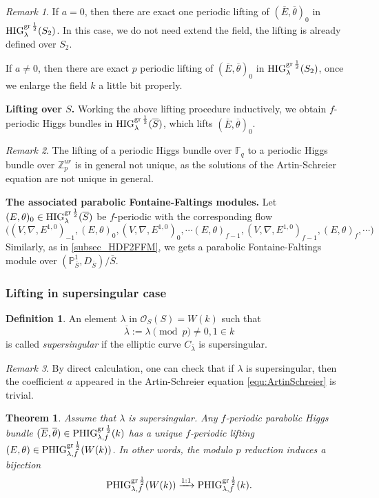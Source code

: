 \documentclass[12pt,twoside]{book}
\theoremstyle{plain}
\newtheorem{theorem}{Theorem}[section]
\theoremstyle{definition}
\newtheorem{definition}[definition]{Definition}
\theoremstyle{remark}
\newtheorem{remark}[remark]{Remark}
\newcommand{\bP}{{\mathbb P}}
\newcommand{\bZ}{{\mathbb Z}}
\newcommand{\mO}{{\mathcal O}}
\newcommand{\Fq}{{\mathbb{F}_q}}
\numberwithin{equation}{section}
\def\High{{\mathrm{HIG}^{{\rm gr}\,{1\over 2}}_{\lambda}}}
\def\PHighf{{\mathrm{PHIG}^{{\rm gr}\,{1\over 2}}_{\lambda,f}}}
\begin{document}
\begin{remark}
If $a=0$, then there are exact one periodic lifting of $(\overline E,\overline\theta)_{0}$ in $\High(S_2)$. In this case, we do not need extend the field, the lifting is already defined over $S_2$.

If $a\neq 0$, then there are exact $p$ periodic lifting of $(\overline E,\overline\theta)_{0}$ in $\High(S_2)$, once we enlarge the field $k$ a little bit properly.
\end{remark}

\textbf{Lifting over $S$.} Working the above lifting procedure inductively, we obtain $f$-periodic Higgs bundles in $\High(\overline{S})$, which lifts $(\overline E,\overline\theta)_{0}$.

\begin{remark}
The lifting of a periodic Higgs bundle over $\Fq$ to a periodic Higgs bundle over $\bZ_p^{ur}$ is in general not unique, as the solutions of the Artin-Schreier equation are not unique in general.
\end{remark}

\textbf{The associated parabolic Fontaine-Faltings modules.} Let $(E,\theta)_0\in \High(\overline{S})$ be $f$-periodic with the corresponding flow
\[\Big((V,\nabla,E^{1,0})_{-1},(E,\theta)_0,(V,\nabla,E^{1,0})_0,\cdots (E,\theta)_{f-1},(V,\nabla,E^{1,0})_{f-1},(E,\theta)_f,\cdots\Big)\]
Similarly, as in \autoref{subsec_HDF2FFM}, we gets a parabolic Fontaine-Faltings module over $(\bP_{\overline{S}}^1,D_{\overline{S}})/\overline{S}$.


\subsubsection{Lifting in supersingular case}
\begin{definition}
An element $\lambda$ in $\mO_S(S)=W(k)$ such that
\[\overline{\lambda}:=\lambda\pmod{p}\neq 0,1\in k\]
is called \emph{supersingular} if the elliptic curve
$C_{\overline\lambda}$ is supersingular.
\end{definition}


\begin{remark} By direct calculation, one can check that if $\lambda$ is supersingular, then the coefficient $a$ appeared in the Artin-Schreier equation \eqref{equ:ArtinSchreier} is trivial.
\end{remark}


\begin{theorem} \label{mthm_PHIGk2PHIGW}
Assume that $\lambda$ is supersingular. Any $f$-periodic parabolic Higgs bundle $(\overline E,\overline\theta)\in\PHighf(k)$ has a unique $f$-periodic lifting $(E,\theta) \in\PHighf(W(k))$. In other words, the modulo $p$ reduction induces a bijection
\[\PHighf(W(k)) \xrightarrow{1:1} \PHighf(k).\]
\end{theorem}
\end{document}
